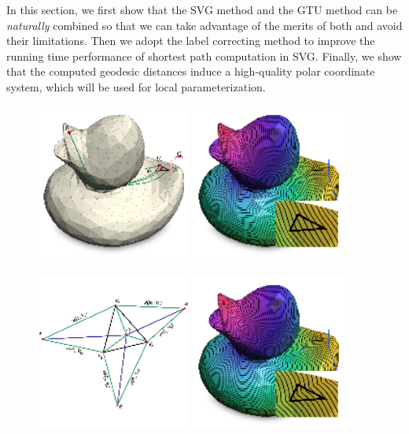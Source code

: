   In this section, we first show that the SVG method and the GTU method can be \textit{naturally} combined
  so that we can take advantage of the merits of both and avoid their limitations.
  Then we adopt the label correcting method to improve the running time performance of shortest path computation in SVG.
  Finally, we show that the computed geodesic distances induce a high-quality polar coordinate system, which will be used for local parameterization.

  \begin{figure}[htbp]
  \centering
  \includegraphics[height=2in]{figs/asd/fig2_a.png}
  \includegraphics[height=2in]{figs/asd/fig2_b.png}\\
  \\
  \includegraphics[height=2in]{figs/asd/fig2_c.png}
  \includegraphics[height=2in]{figs/asd/fig2_d.png}\\

\end{figure}
